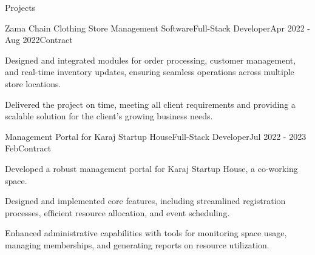\documentclass[]{kyvernitis-resume}
\begin{document}
\begin{section}{Projects}
\begin{subsection}{Zama Chain Clothing Store Management Software}{Full-Stack Developer}{Apr 2022 - Aug 2022}{Contract}{}
		\item Designed and integrated modules for order processing, customer management, and real-time inventory updates, ensuring seamless operations across multiple store locations.
		\item Delivered the project on time, meeting all client requirements and providing a scalable solution for the client's growing business needs.

    \end{subsection}

\begin{subsection}{Management Portal for Karaj Startup House}{Full-Stack Developer}{Jul 2022 - 2023 Feb}{Contract}{}
		\item Developed a robust management portal for Karaj Startup House, a co-working space.
		\item Designed and implemented core features, including streamlined registration processes, efficient resource allocation, and event scheduling.
		\item Enhanced administrative capabilities with tools for monitoring space usage, managing memberships, and generating reports on resource utilization.    
\end{subsection}


    
\end{section}
\end{document}
